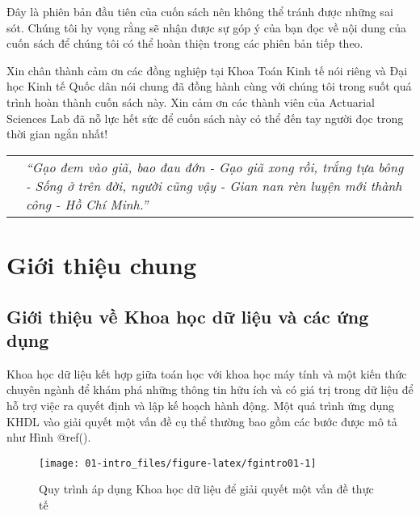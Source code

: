 \documentclass[
]{article}
\begin{document}
Đây là phiên bản đầu tiên của cuốn sách nên không thể tránh được những sai sót. Chúng tôi hy vọng rằng sẽ nhận được sự góp ý của bạn đọc về nội dung của cuốn sách để chúng tôi có thể hoàn thiện trong các phiên bản tiếp theo.

Xin chân thành cảm ơn các đồng nghiệp tại Khoa Toán Kinh tế nói riêng và Đại học Kinh tế Quốc dân nói chung đã đồng hành cùng với chúng tôi trong suốt quá trình hoàn thành cuốn sách này. Xin cảm ơn các thành viên của Actuarial Sciences Lab đã nỗ lực hết sức để cuốn sách này có thể đến tay người đọc trong thời gian ngắn nhất!

\begin{longtable}[]{@{}
  >{\raggedright\arraybackslash}p{}
  >{\raggedright\arraybackslash}p{}@{}}
\toprule\noalign{}
\endhead
\bottomrule\noalign{}
\endlastfoot
& \emph{``Gạo đem vào giã, bao đau đớn - Gạo giã xong rồi, trắng tựa bông - Sống ở trên đời, người cũng vậy - Gian nan rèn luyện mới thành công - Hồ Chí Minh.''} \\
\end{longtable}

\hypertarget{giux1edbi-thiux1ec7u-chung}{%
\section{Giới thiệu chung}\label{giux1edbi-thiux1ec7u-chung}}

\hypertarget{giux1edbi-thiux1ec7u-vux1ec1-khoa-hux1ecdc-dux1eef-liux1ec7u-vuxe0-cuxe1c-ux1ee9ng-dux1ee5ng}{%
\subsection{Giới thiệu về Khoa học dữ liệu và các ứng dụng}\label{giux1edbi-thiux1ec7u-vux1ec1-khoa-hux1ecdc-dux1eef-liux1ec7u-vuxe0-cuxe1c-ux1ee9ng-dux1ee5ng}}

Khoa học dữ liệu kết hợp giữa toán học với khoa học máy tính và một kiến thức chuyên ngành để khám phá những thông tin hữu ích và có giá trị trong dữ liệu để hỗ trợ việc ra quyết định và lập kế hoạch hành động. Một quá trình ứng dụng KHDL vào giải quyết một vấn đề cụ thể thường bao gồm các bước được mô tả như Hình @ref().

\begin{figure}

{\centering \texttt{[image: 01-intro\_files/figure-latex/fgintro01-1]} 

}

\caption{Quy trình áp dụng Khoa học dữ liệu để giải quyết một vấn đề thực tế}\label{fig:fgintro01}
\end{figure}
\end{document}

